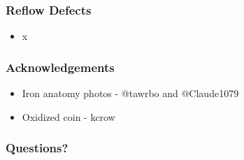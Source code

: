 \documentclass{beamer}
\begin{document}
\begin{frame}
\frametitle{Reflow Defects}
\begin{itemize}
\item x
\end{itemize}
\end{frame}

\begin{frame}
\frametitle{Acknowledgements}
\begin{itemize}
\item Iron anatomy photos - @tawrbo and @Claude1079
\item Oxidized coin - kcrow
\end{itemize}
\end{frame}

\begin{frame}
\frametitle{Questions?}
\end{frame}
\end{document}
